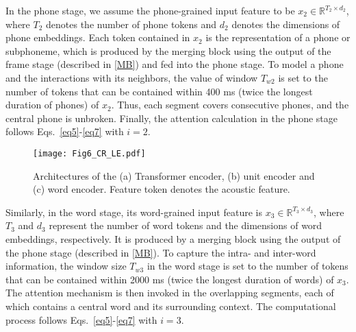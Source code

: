 \documentclass[lettersize,journal]{IEEEtran}
\begin{document}
In the phone stage, we assume the phone-grained input feature to be $x_2 \in \mathbb{R}^{T_2 \times d_2}$, where $T_2$ denotes the number of phone tokens and $d_2$ denotes the dimensions of phone embeddings. Each token contained in $x_2$ is the representation of a phone or subphoneme, which is produced by the merging block using the output of the frame stage (described in \ref{MB}) and fed into the phone stage. To model a phone and the interactions with its neighbors, the value of window $T_{w2}$ is set to the number of tokens that can be contained within 400 ms (twice the longest duration of phones) of $x_2$. Thus, each segment covers consecutive phones, and the central phone is unbroken. Finally, the attention calculation in the phone stage follows Eqs.~\ref{eq5}-\ref{eq7} with $i=2$.

\begin{figure}[t]
\centering
\texttt{[image: Fig6\_CR\_LE.pdf]}
\caption{Architectures of the (a) Transformer encoder, (b) unit encoder and (c) word encoder. Feature token denotes the acoustic feature.}
\label{fig_5}
\end{figure}

Similarly, in the word stage, its word-grained input feature is $x_3 \in \mathbb{R}^{T_3 \times d_3}$, where $T_3$ and $d_3$ represent the number of word tokens and the dimensions of word embeddings, respectively. It is produced by a merging block using the output of the phone stage (described in \ref{MB}). To capture the intra- and inter-word information, the window size $T_{w3}$ in the word stage is set to the number of tokens that can be contained within 2000 ms (twice the longest duration of words) of $x_3$. The attention mechanism is then invoked in the overlapping segments, each of which contains a central word and its surrounding context. The computational process follows Eqs.~\ref{eq5}-\ref{eq7} with $i=3$. 
\end{document}
